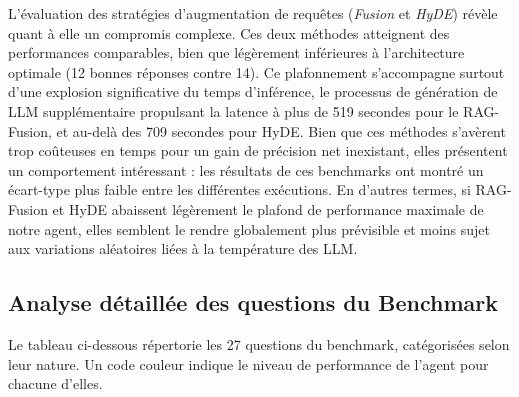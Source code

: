 L'évaluation des stratégies d'augmentation de requêtes (\textit{Fusion} et \textit{HyDE}) révèle quant à elle un compromis complexe. Ces deux méthodes atteignent des performances comparables, bien que légèrement inférieures à l'architecture optimale (12 bonnes réponses contre 14). Ce plafonnement s'accompagne surtout d'une explosion significative du temps d'inférence, le processus de génération de LLM supplémentaire propulsant la latence à plus de 519 secondes pour le RAG-Fusion, et au-delà des 709 secondes pour HyDE. Bien que ces méthodes s'avèrent trop coûteuses en temps pour un gain de précision net inexistant, elles présentent un comportement intéressant : les résultats de ces benchmarks ont montré un écart-type plus faible entre les différentes exécutions. En d'autres termes, si RAG-Fusion et HyDE abaissent légèrement le plafond de performance maximale de notre agent, elles semblent le rendre globalement plus prévisible et moins sujet aux variations aléatoires liées à la température des LLM.

\subsection{Analyse détaillée des questions du Benchmark}

Le tableau ci-dessous répertorie les 27 questions du benchmark, catégorisées selon leur nature. Un code couleur indique le niveau de performance de l'agent pour chacune d'elles.

\vspace{0.5cm}


